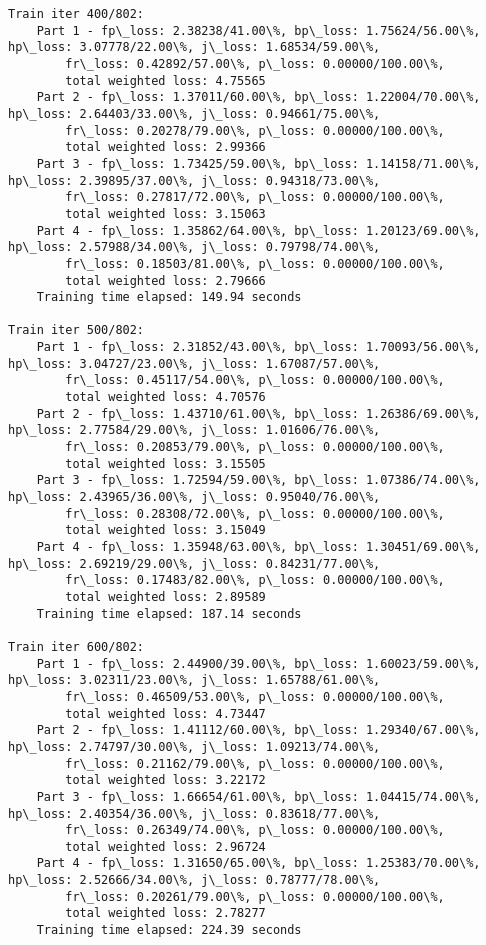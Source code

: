 \documentclass[11pt]{article}
\begin{document}
\begin{Verbatim}[commandchars=\\\{\}]
Train iter 400/802:
	Part 1 - fp\_loss: 2.38238/41.00\%, bp\_loss: 1.75624/56.00\%, hp\_loss: 3.07778/22.00\%, j\_loss: 1.68534/59.00\%, 
		fr\_loss: 0.42892/57.00\%, p\_loss: 0.00000/100.00\%, 
		total weighted loss: 4.75565
	Part 2 - fp\_loss: 1.37011/60.00\%, bp\_loss: 1.22004/70.00\%, hp\_loss: 2.64403/33.00\%, j\_loss: 0.94661/75.00\%, 
		fr\_loss: 0.20278/79.00\%, p\_loss: 0.00000/100.00\%, 
		total weighted loss: 2.99366
	Part 3 - fp\_loss: 1.73425/59.00\%, bp\_loss: 1.14158/71.00\%, hp\_loss: 2.39895/37.00\%, j\_loss: 0.94318/73.00\%, 
		fr\_loss: 0.27817/72.00\%, p\_loss: 0.00000/100.00\%, 
		total weighted loss: 3.15063
	Part 4 - fp\_loss: 1.35862/64.00\%, bp\_loss: 1.20123/69.00\%, hp\_loss: 2.57988/34.00\%, j\_loss: 0.79798/74.00\%, 
		fr\_loss: 0.18503/81.00\%, p\_loss: 0.00000/100.00\%, 
		total weighted loss: 2.79666
	Training time elapsed: 149.94 seconds

Train iter 500/802:
	Part 1 - fp\_loss: 2.31852/43.00\%, bp\_loss: 1.70093/56.00\%, hp\_loss: 3.04727/23.00\%, j\_loss: 1.67087/57.00\%, 
		fr\_loss: 0.45117/54.00\%, p\_loss: 0.00000/100.00\%, 
		total weighted loss: 4.70576
	Part 2 - fp\_loss: 1.43710/61.00\%, bp\_loss: 1.26386/69.00\%, hp\_loss: 2.77584/29.00\%, j\_loss: 1.01606/76.00\%, 
		fr\_loss: 0.20853/79.00\%, p\_loss: 0.00000/100.00\%, 
		total weighted loss: 3.15505
	Part 3 - fp\_loss: 1.72594/59.00\%, bp\_loss: 1.07386/74.00\%, hp\_loss: 2.43965/36.00\%, j\_loss: 0.95040/76.00\%, 
		fr\_loss: 0.28308/72.00\%, p\_loss: 0.00000/100.00\%, 
		total weighted loss: 3.15049
	Part 4 - fp\_loss: 1.35948/63.00\%, bp\_loss: 1.30451/69.00\%, hp\_loss: 2.69219/29.00\%, j\_loss: 0.84231/77.00\%, 
		fr\_loss: 0.17483/82.00\%, p\_loss: 0.00000/100.00\%, 
		total weighted loss: 2.89589
	Training time elapsed: 187.14 seconds

Train iter 600/802:
	Part 1 - fp\_loss: 2.44900/39.00\%, bp\_loss: 1.60023/59.00\%, hp\_loss: 3.02311/23.00\%, j\_loss: 1.65788/61.00\%, 
		fr\_loss: 0.46509/53.00\%, p\_loss: 0.00000/100.00\%, 
		total weighted loss: 4.73447
	Part 2 - fp\_loss: 1.41112/60.00\%, bp\_loss: 1.29340/67.00\%, hp\_loss: 2.74797/30.00\%, j\_loss: 1.09213/74.00\%, 
		fr\_loss: 0.21162/79.00\%, p\_loss: 0.00000/100.00\%, 
		total weighted loss: 3.22172
	Part 3 - fp\_loss: 1.66654/61.00\%, bp\_loss: 1.04415/74.00\%, hp\_loss: 2.40354/36.00\%, j\_loss: 0.83618/77.00\%, 
		fr\_loss: 0.26349/74.00\%, p\_loss: 0.00000/100.00\%, 
		total weighted loss: 2.96724
	Part 4 - fp\_loss: 1.31650/65.00\%, bp\_loss: 1.25383/70.00\%, hp\_loss: 2.52666/34.00\%, j\_loss: 0.78777/78.00\%, 
		fr\_loss: 0.20261/79.00\%, p\_loss: 0.00000/100.00\%, 
		total weighted loss: 2.78277
	Training time elapsed: 224.39 seconds


\end{Verbatim}
\end{document}
